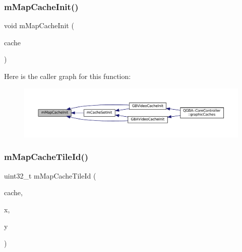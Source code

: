 \subsubsection{\texorpdfstring{m\+Map\+Cache\+Init()}{mMapCacheInit()}}
{\footnotesize\ttfamily void m\+Map\+Cache\+Init (\begin{DoxyParamCaption}\item[{struct m\+Map\+Cache $\ast$}]{cache }\end{DoxyParamCaption})}

Here is the caller graph for this function\+:
\nopagebreak
\begin{figure}[H]
\begin{center}
\leavevmode
\includegraphics[width=350pt]{map-cache_8c_a29d009ada615c07ef3ad61a09b0e2625_icgraph}
\end{center}
\end{figure}
\mbox{\label{map-cache_8c_a330e8e4a849ed5b322b16c1fbea42b3f}} 
\subsubsection{\texorpdfstring{m\+Map\+Cache\+Tile\+Id()}{mMapCacheTileId()}}
{\footnotesize\ttfamily uint32\+\_\+t m\+Map\+Cache\+Tile\+Id (\begin{DoxyParamCaption}\item[{struct m\+Map\+Cache $\ast$}]{cache,  }\item[{unsigned}]{x,  }\item[{unsigned}]{y }\end{DoxyParamCaption})}

